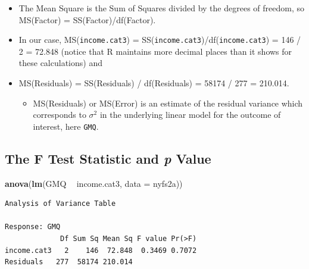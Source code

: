\documentclass[
]{book}
\newenvironment{Shaded}{\begin{snugshade}}{\end{snugshade}}
\newcommand{\DataTypeTok}[1]{\textcolor[rgb]{0.13,0.29,0.53}{#1}}
\newcommand{\KeywordTok}[1]{\textcolor[rgb]{0.13,0.29,0.53}{\textbf{#1}}}
\newcommand{\NormalTok}[1]{#1}
\newcommand{\OperatorTok}[1]{\textcolor[rgb]{0.81,0.36,0.00}{\textbf{#1}}}
\newcommand{\StringTok}[1]{\textcolor[rgb]{0.31,0.60,0.02}{#1}}
\providecommand{\tightlist}{%
  \setlength{\itemsep}{0pt}\setlength{\parskip}{0pt}}
\begin{document}
\begin{itemize}
\tightlist
\item
  The Mean Square is the Sum of Squares divided by the degrees of freedom, so MS(Factor) = SS(Factor)/df(Factor).
\item
  In our case, MS(\texttt{income.cat3}) = SS(\texttt{income.cat3})/df(\texttt{income.cat3}) = 146 / 2 = 72.848 (notice that R maintains more decimal places than it shows for these calculations) and
\item
  MS(Residuals) = SS(Residuals) / df(Residuals) = 58174 / 277 = 210.014.

  \begin{itemize}
  \tightlist
  \item
    MS(Residuals) or MS(Error) is an estimate of the residual variance which corresponds to \(\sigma^2\) in the underlying linear model for the outcome of interest, here \texttt{GMQ}.
  \end{itemize}
\end{itemize}

\hypertarget{the-f-test-statistic-and-p-value}{%
\subsection{\texorpdfstring{The F Test Statistic and \emph{p} Value}{The F Test Statistic and p Value}}\label{the-f-test-statistic-and-p-value}}

\begin{Shaded}
\begin{Highlighting}[]
\KeywordTok{anova}\NormalTok{(}\KeywordTok{lm}\NormalTok{(GMQ }\OperatorTok{~}\StringTok{ }\NormalTok{income.cat3, }\DataTypeTok{data =}\NormalTok{ nyfs2a))}
\end{Highlighting}
\end{Shaded}

\begin{verbatim}
Analysis of Variance Table

Response: GMQ
             Df Sum Sq Mean Sq F value Pr(>F)
income.cat3   2    146  72.848  0.3469 0.7072
Residuals   277  58174 210.014               
\end{verbatim}
\end{document}
